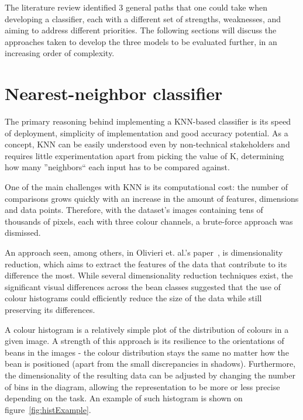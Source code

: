 The literature review identified 3 general paths that one could take when developing a classifier, each with a different
set of strengths, weaknesses, and aiming to address different priorities.
The following sections will discuss the approaches taken to develop the three models to be evaluated further, in an
increasing order of complexity.


\section{Nearest-neighbor classifier}
\label{sec:knn-classifier}
The primary reasoning behind implementing a KNN-based classifier is its speed of deployment, simplicity of implementation
and good accuracy potential.
As a concept, KNN can be easily understood even by non-technical stakeholders and requires little experimentation apart
from picking the value of K, determining how many ''neighbors`` each input has to be compared against.

One of the main challenges with KNN is its computational cost: the number of comparisons grows quickly with an increase
in the amount of features, dimensions and data points.
Therefore, with the dataset's images containing tens of thousands of pixels, each with three colour channels, a brute-force
approach was dismissed.

An approach seen, among others, in Olivieri et. al.'s paper~\cite{hyperspectralGreenOliveri}, is dimensionality reduction,
which aims to extract the features of the data that contribute to its difference the most.
While several dimensionality reduction techniques exist, the significant visual differences across the bean classes suggested
that the use of colour histograms could efficiently reduce the size of the data while still preserving its differences.

A colour histogram is a relatively simple plot of the distribution of colours in a given image.
A strength of this approach is its resilience to the orientations of beans in the images - the colour distribution stays
the same no matter how the bean is positioned (apart from the small discrepancies in shadows).
Furthermore, the dimensionality of the resulting data can be adjusted by changing the number of bins in the diagram, allowing
the representation to be more or less precise depending on the task.
An example of such histogram is shown on figure~\ref{fig:histExample}.

